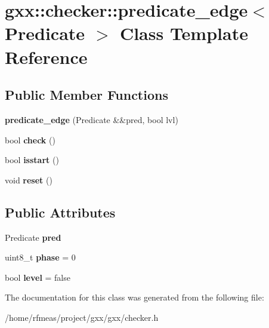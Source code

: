 \hypertarget{classgxx_1_1checker_1_1predicate__edge}{}\section{gxx\+:\+:checker\+:\+:predicate\+\_\+edge$<$ Predicate $>$ Class Template Reference}
\label{classgxx_1_1checker_1_1predicate__edge}
\subsection*{Public Member Functions}
\begin{DoxyCompactItemize}
\item 
{\bfseries predicate\+\_\+edge} (Predicate \&\&pred, bool lvl)\hypertarget{classgxx_1_1checker_1_1predicate__edge_ae1b9ac2ac99e14b621d55e91307ca4d1}{}\label{classgxx_1_1checker_1_1predicate__edge_ae1b9ac2ac99e14b621d55e91307ca4d1}

\item 
bool {\bfseries check} ()\hypertarget{classgxx_1_1checker_1_1predicate__edge_af128ceafeca2e69928852517d42098ed}{}\label{classgxx_1_1checker_1_1predicate__edge_af128ceafeca2e69928852517d42098ed}

\item 
bool {\bfseries isstart} ()\hypertarget{classgxx_1_1checker_1_1predicate__edge_a8a28cd4ca9e0c9ad097876830dc63204}{}\label{classgxx_1_1checker_1_1predicate__edge_a8a28cd4ca9e0c9ad097876830dc63204}

\item 
void {\bfseries reset} ()\hypertarget{classgxx_1_1checker_1_1predicate__edge_afe90534a0d39e22a7185a2b565636256}{}\label{classgxx_1_1checker_1_1predicate__edge_afe90534a0d39e22a7185a2b565636256}

\end{DoxyCompactItemize}
\subsection*{Public Attributes}
\begin{DoxyCompactItemize}
\item 
Predicate {\bfseries pred}\hypertarget{classgxx_1_1checker_1_1predicate__edge_a0d0f71f59f5153edf553ac9a7432e2f8}{}\label{classgxx_1_1checker_1_1predicate__edge_a0d0f71f59f5153edf553ac9a7432e2f8}

\item 
uint8\+\_\+t {\bfseries phase} = 0\hypertarget{classgxx_1_1checker_1_1predicate__edge_ae9e1217ffe7b5b5ca4b505c57e48624e}{}\label{classgxx_1_1checker_1_1predicate__edge_ae9e1217ffe7b5b5ca4b505c57e48624e}

\item 
bool {\bfseries level} = false\hypertarget{classgxx_1_1checker_1_1predicate__edge_a97432fe60363e7d0326174feefe6e2a0}{}\label{classgxx_1_1checker_1_1predicate__edge_a97432fe60363e7d0326174feefe6e2a0}

\end{DoxyCompactItemize}


The documentation for this class was generated from the following file\+:\begin{DoxyCompactItemize}
\item 
/home/rfmeas/project/gxx/gxx/checker.\+h\end{DoxyCompactItemize}
